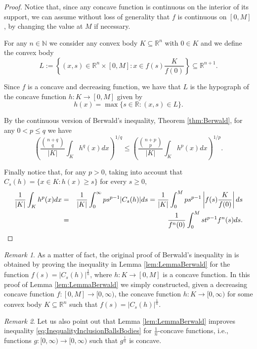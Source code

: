 \documentclass{amsart}
\newcommand{\R}{\mathbb R}
\newcommand{\N}{\mathbb N}
\theoremstyle{remark}
\newtheorem{rmk}{Remark}
\theoremstyle{definition}
\numberwithin{equation}{section}
\begin{document}
\begin{proof} Notice that, since any concave function is continuous on the interior of its support, we can assume without loss of generality that $f$ is continuous on $[0,M]$, by changing the value at $M$ if necessary.

For any $n \in \N$ we consider any convex body $K \subseteq \R^n$ with $0 \in K$ and we define the convex body
\[
L:=\left\{ (x,s) \in \R^n \times [0,M] : x \in f(s) \frac{K}{f(0)} \right\}\subseteq\R^{n+1}.
\]

Since $f$ is a concave and decreasing function, we have that $L$ is the hypograph of the concave function $h: K \to [0,M]$ given by
\[
h(x) = \max \{ s \in \R: (x,s) \in L \}.
\]


By the continuous version of Berwald's inequality, Theorem \ref{thm:Berwald}, for any $0<p\leq q$ we have
\[
\left( \frac{\binom{n+q}{q}}{|K|} \int_K h^q(x) dx  \right)^{1/q} \leq \left( \frac{\binom{n+p}{p}}{|K|} \int_K h^p(x) dx  \right)^{1/p}.
\]

Finally notice that, for any $p>0$, taking into account that $C_s(h)=\{ x \in K: h(x) \geq s \}$ for every $s\geq0$,
\begin{eqnarray*}
\frac{1}{|K|}\int_K h^p(x) dx &=& \frac{1}{|K|}\int_0^{\infty} p s^{p-1} |C_s(h)| ds = \frac{1}{|K|}\int_0^M p s^{p-1} \left | f(s) \frac{K}{f(0)} \right | ds\cr
& = &\frac{1}{f^n(0)} \int_0^M st^{p-1} f^n(s) ds.
\end{eqnarray*}
\end{proof}

\begin{rmk}
As a matter of fact, the original proof of Berwald's inequality in \cite{Be} is obtained by proving the inequality in Lemma \ref{lem:LemmaBerwald} for the function $f(s)=|C_s(h)|^\frac{1}{n}$, where $h:K\to[0,M]$ is a concave function. In this proof of Lemma \ref{lem:LemmaBerwald} we simply constructed, given a decreasing concave function $f:[0,M]\to[0,\infty)$, the concave function $h:K\to[0,\infty)$ for some convex body $K\subseteq\R^n$ such that $f(s)=|C_s(h)|^\frac{1}{n}$.
\end{rmk}

\begin{rmk}
Let us also point out that Lemma \ref{lem:LemmaBerwald} improves inequality \eqref{eq:InequalityInclusionBallsBodies} for $\frac{1}{n}$-concave functions, i.e., functions $g:[0, \infty)\to[0,\infty)$ such that $g^\frac{1}{n}$ is concave.
\end{rmk}
\end{document}
